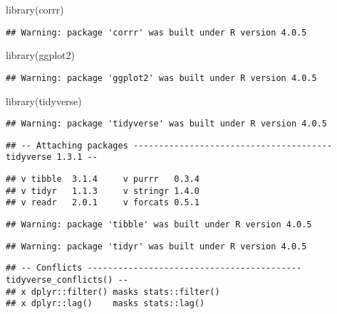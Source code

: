 \documentclass[
]{article}
\newenvironment{Shaded}{\begin{snugshade}}{\end{snugshade}}
\newcommand{\FunctionTok}[1]{\textcolor[rgb]{0.00,0.00,0.00}{#1}}
\newcommand{\NormalTok}[1]{#1}
\begin{document}
\begin{Shaded}
\begin{Highlighting}[]
\FunctionTok{library}\NormalTok{(corrr)}
\end{Highlighting}
\end{Shaded}

\begin{verbatim}
## Warning: package 'corrr' was built under R version 4.0.5
\end{verbatim}

\begin{Shaded}
\begin{Highlighting}[]
\FunctionTok{library}\NormalTok{(ggplot2)}
\end{Highlighting}
\end{Shaded}

\begin{verbatim}
## Warning: package 'ggplot2' was built under R version 4.0.5
\end{verbatim}

\begin{Shaded}
\begin{Highlighting}[]
\FunctionTok{library}\NormalTok{(tidyverse)}
\end{Highlighting}
\end{Shaded}

\begin{verbatim}
## Warning: package 'tidyverse' was built under R version 4.0.5
\end{verbatim}

\begin{verbatim}
## -- Attaching packages --------------------------------------- tidyverse 1.3.1 --
\end{verbatim}

\begin{verbatim}
## v tibble  3.1.4     v purrr   0.3.4
## v tidyr   1.1.3     v stringr 1.4.0
## v readr   2.0.1     v forcats 0.5.1
\end{verbatim}

\begin{verbatim}
## Warning: package 'tibble' was built under R version 4.0.5
\end{verbatim}

\begin{verbatim}
## Warning: package 'tidyr' was built under R version 4.0.5
\end{verbatim}

\begin{verbatim}
## -- Conflicts ------------------------------------------ tidyverse_conflicts() --
## x dplyr::filter() masks stats::filter()
## x dplyr::lag()    masks stats::lag()
\end{verbatim}
\end{document}
